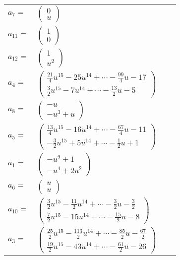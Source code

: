 \documentclass[1p]{elsarticle_modified}
\theoremstyle{definition}
\begin{document}
\begin{tabular}{m{7pt} m{180pt} m{7pt} m{180pt} }
\flushright $a_{7}=$&$\begin{pmatrix}0\\u\end{pmatrix}$ \\
\flushright $a_{11}=$&$\begin{pmatrix}1\\0\end{pmatrix}$ \\
\flushright $a_{12}=$&$\begin{pmatrix}1\\u^2\end{pmatrix}$ \\
\flushright $a_{4}=$&$\begin{pmatrix}\frac{21}{4} u^{15}-25 u^{14}+\cdots-\frac{99}{4} u-17\\\frac{3}{2} u^{15}-7 u^{14}+\cdots-\frac{13}{2} u-5\end{pmatrix}$ \\
\flushright $a_{8}=$&$\begin{pmatrix}- u\\- u^3+u\end{pmatrix}$ \\
\flushright $a_{5}=$&$\begin{pmatrix}\frac{13}{4} u^{15}-16 u^{14}+\cdots-\frac{67}{4} u-11\\-\frac{3}{2} u^{15}+5 u^{14}+\cdots-\frac{1}{2} u+1\end{pmatrix}$ \\
\flushright $a_{1}=$&$\begin{pmatrix}- u^2+1\\- u^4+2 u^2\end{pmatrix}$ \\
\flushright $a_{6}=$&$\begin{pmatrix}u\\u\end{pmatrix}$ \\
\flushright $a_{10}=$&$\begin{pmatrix}\frac{3}{2} u^{15}-\frac{11}{2} u^{14}+\cdots-\frac{3}{2} u-\frac{3}{2}\\\frac{7}{2} u^{15}-15 u^{14}+\cdots-\frac{15}{2} u-8\end{pmatrix}$ \\
\flushright $a_{3}=$&$\begin{pmatrix}\frac{25}{2} u^{15}-\frac{113}{2} u^{14}+\cdots-\frac{85}{2} u-\frac{67}{2}\\\frac{19}{2} u^{15}-43 u^{14}+\cdots-\frac{61}{2} u-26\end{pmatrix}$ \\

\end{tabular}
\end{document}
